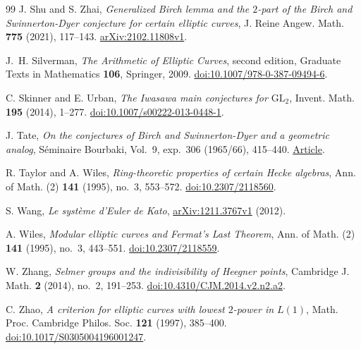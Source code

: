 \begin{thebibliography}{99}
J. Shu and S. Zhai,
\emph{Generalized Birch lemma and the $2$-part of the Birch and Swinnerton-Dyer conjecture for certain elliptic curves},
J. Reine Angew. Math. \textbf{775} (2021), 117--143.
\href{https://arxiv.org/abs/2102.11808v1}{arXiv:2102.11808v1}.

J.~H. Silverman,
\emph{The Arithmetic of Elliptic Curves}, second edition,
Graduate Texts in Mathematics \textbf{106}, Springer, 2009.
\href{https://doi.org/10.1007/978-0-387-09494-6}{doi:10.1007/978-0-387-09494-6}.

C. Skinner and E. Urban,
\emph{The Iwasawa main conjectures for $\mathrm{GL}_2$},
Invent. Math. \textbf{195} (2014), 1--277.
\href{https://doi.org/10.1007/s00222-013-0448-1}{doi:10.1007/s00222-013-0448-1}.

J. Tate,
\emph{On the conjectures of Birch and Swinnerton-Dyer and a geometric analog},
S\'eminaire Bourbaki, Vol.~9, exp.~306 (1965/66), 415--440.
\href{https://numdam.org/item/SB_1964-1966__9__415_0.pdf}{Article}.

R. Taylor and A. Wiles,
\emph{Ring-theoretic properties of certain Hecke algebras},
Ann. of Math. (2) \textbf{141} (1995), no.~3, 553--572.
\href{https://doi.org/10.2307/2118560}{doi:10.2307/2118560}.

S. Wang,
\emph{Le syst\`eme d'Euler de Kato},
\href{https://arxiv.org/abs/1211.3767v1}{arXiv:1211.3767v1} (2012).

A. Wiles,
\emph{Modular elliptic curves and Fermat's Last Theorem},
Ann. of Math. (2) \textbf{141} (1995), no.~3, 443--551.
\href{https://doi.org/10.2307/2118559}{doi:10.2307/2118559}.

W. Zhang,
\emph{Selmer groups and the indivisibility of Heegner points},
Cambridge J. Math. \textbf{2} (2014), no.~2, 191--253.
\href{https://doi.org/10.4310/CJM.2014.v2.n2.a2}{doi:10.4310/CJM.2014.v2.n2.a2}.

C. Zhao,
\emph{A criterion for elliptic curves with lowest $2$-power in $L(1)$},
Math. Proc. Cambridge Philos. Soc. \textbf{121} (1997), 385--400.
\href{https://doi.org/10.1017/S0305004196001247}{doi:10.1017/S0305004196001247}.

\end{thebibliography}
